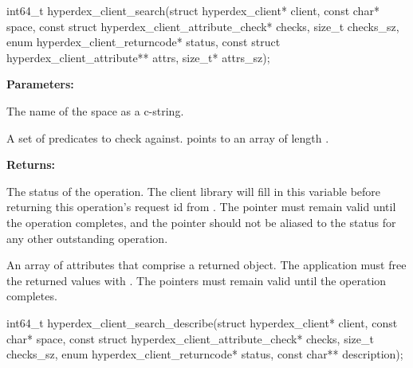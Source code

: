 \funcsep
{}
\begin{ccode}
int64_t hyperdex_client_search(struct hyperdex_client* client,
                const char* space,
                const struct hyperdex_client_attribute_check* checks, size_t checks_sz,
                enum hyperdex_client_returncode* status,
                const struct hyperdex_client_attribute** attrs, size_t* attrs_sz);
\end{ccode}
\funcdesc 

\noindent\textbf{Parameters:}
\begin{description}[labelindent=\widthof{{\code{checks}, \code{checks\_sz}}},leftmargin=*,noitemsep,nolistsep,align=right]
\item[\code{space}] The name of the space as a c-string.
\item[\code{checks}, \code{checks\_sz}] A set of predicates to check against.   points to an array of length .
\end{description}

\noindent\textbf{Returns:}
\begin{description}[labelindent=\widthof{{\code{attrs}, \code{attrs\_sz}}},leftmargin=*,noitemsep,nolistsep,align=right]
\item[\code{status}] The status of the operation.  The client library will fill in this variable before returning this operation's request id from .  The pointer must remain valid until the operation completes, and the pointer should not be aliased to the status for any other outstanding operation.
\item[\code{attrs}, \code{attrs\_sz}] An array of attributes that comprise a returned object.  The application must free the returned values with .  The pointers must remain valid until the operation completes.
\end{description}

\funcsep
{}
\begin{ccode}
int64_t hyperdex_client_search_describe(struct hyperdex_client* client,
                const char* space,
                const struct hyperdex_client_attribute_check* checks, size_t checks_sz,
                enum hyperdex_client_returncode* status,
                const char** description);
\end{ccode}
\funcdesc 

